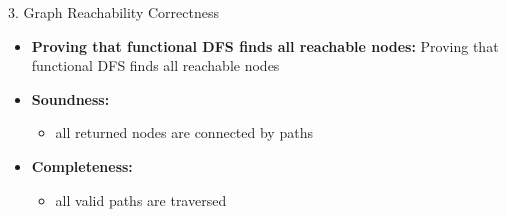 \documentclass[compress,10pt,xcolor=dvipsnames]{beamer}
\begin{document}
\begin{frame}{3. Graph Reachability Correctness}

\begin{itemize}
  \item \textbf{Proving that functional DFS finds all reachable nodes:} Proving that functional DFS finds all reachable nodes
  \item \textbf{Soundness:}
    \begin{itemize}
      \item all returned nodes are connected by paths
    \end{itemize}
  \item \textbf{Completeness:}
    \begin{itemize}
      \item all valid paths are traversed
    \end{itemize}
\end{itemize}
\end{frame}
\end{document}
